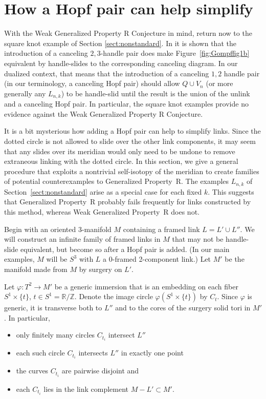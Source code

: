 \documentclass{amsart}
\def\zed{{\mathbb Z}}
\def\R{{\mathbb R}}
\begin{document}
\section{How a Hopf pair can help simplify} \label{sect:Hopf}

With the Weak Generalized Property R Conjecture in mind, return now to the square knot example of Section \ref{sect:nonstandard}.   In \cite{Go1} it is shown that the introduction of a canceling $2, 3$-handle pair does make Figure~\ref{fig:Gompffig1b} equivalent by handle-slides to the corresponding canceling diagram.  In our dualized context, that means that the introduction of a canceling $1, 2$ handle pair (in our terminology, a canceling Hopf pair) should allow $Q \cup V_n$ (or more generally any $L_{n,k}$) to be handle-slid until the result is the union of the unlink and a canceling Hopf pair.  In particular, the square knot examples provide no evidence against the Weak Generalized Property R Conjecture.

It is a bit mysterious how adding a Hopf pair can help to simplify links. Since the dotted circle is not allowed to slide over the other link components, it may seem that any slides over its meridian would only need to be undone to remove extraneous linking with the dotted circle. In this section, we give a general procedure that exploits a nontrivial self-isotopy of the meridian to create families of potential counterexamples to Generalized Property~R. The examples $L_{n,k}$ of Section~\ref{sect:nonstandard} arise as a special case for each fixed $k$.  This suggests that Generalized Property~R probably fails frequently for links constructed by this method, whereas Weak Generalized Property~R does not.

\bigskip

Begin with an oriented 3-manifold $M$ containing a framed link $L=L'\cup L''$.  We will construct an infinite family of framed links in $M$ that may not be handle-slide equivalent, but become so after a Hopf pair is added. (In our main examples, $M$ will be $S^3$ with $L$ a 0-framed 2-component link.) Let $M'$ be the manifold made from $M$ by surgery on $L'$.

Let $\varphi: T^2\to M'$ be a generic immersion that is an embedding on each fiber $S^1\times\{t\}$, $t\in S^1=\R/\zed$.  Denote the image circle $\varphi(S^1\times\{t\})$ by $C_t$. Since $\varphi$ is generic, it is transverse both to $L''$ and to the cores of the surgery solid tori in $M'$.  In particular,
\begin{itemize}
\item only finitely many circles $C_{t_i}$  intersect $L''$
\item each such circle $C_{t_i}$ intersects $L''$ in exactly one point
\item the curves $C_{t_i}$ are pairwise disjoint and
\item each $C_{t_i}$ lies in the link complement $M-L' \subset M'$.
\end{itemize}
\end{document}
